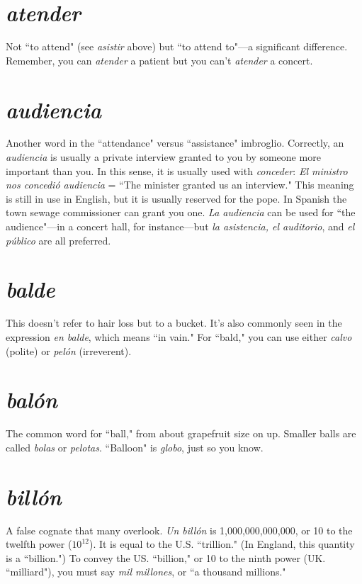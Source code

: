 \section{\emph{atender}}

Not ``to attend" (see \emph{asistir} above) but ``to attend
to"---a significant difference. Remember, you can \emph{atender} a patient but you can't \emph{atender} a concert.

\section{\emph{audiencia}}

Another word in the ``attendance" versus ``assistance" imbroglio. Correctly, an \emph{audiencia} is usually a private interview granted to you by someone more important than you. In this
sense, it is usually used with \emph{conceder}: \emph{El ministro nos concedió audiencia} = ``The minister granted us an interview." This meaning is
still in use in English, but it is usually reserved for the pope. In Spanish the town sewage commissioner can grant you one. \emph{La audiencia}
can be used for ``the audience"---in a concert hall, for instance---but \emph{la
asistencia, el auditorio}, and \emph{el público} are all preferred.

\section{\emph{balde}}

This doesn't refer to hair loss but to a bucket. It's also
commonly seen in the expression \emph{en balde}, which means ``in vain."
For ``bald," you can use either \emph{calvo} (polite) or \emph{pelón} (irreverent).

\section{\emph{balón}}

The common word for ``ball," from about grapefruit
size on up. Smaller balls are called \emph{bolas} or \emph{pelotas}. ``Balloon" is
\emph{globo}, just so you know.

\section{\emph{billón}}

A false cognate that many overlook. \emph{Un billón} is
1,000,000,000,000, or 10 to the twelfth power ($10^{12}$). It is equal to the
U.S. ``trillion." (In England, this quantity is a ``billion.") To convey the
US. ``billion," or 10 to the ninth power (UK. ``milliard"), you must say
\emph{mil millones}, or ``a thousand millions."

